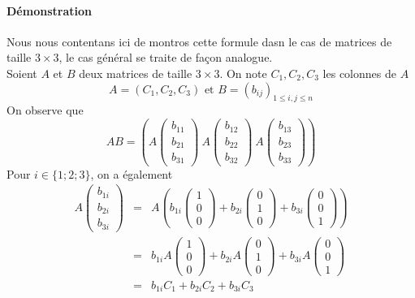 \paragraph{Démonstration} Nous nous contentans ici de montros cette formule dasn le cas de matrices de taille $3 \times 3$, le cas général se traite de façon analogue. \\
Soient $A$ et $B$ deux matrices de taille $3 \times 3$. On note $C_1, C_2, C_3$ les colonnes de $A$
$$A = (C_1, C_2, C_3) \text{ et } B=(b_{ij})_{1 \leq i, j \leq n}$$
On observe que
$$A B = \left(
  A \begin{pmatrix} b_{11} \\ b_{21} \\ b_{31} \end{pmatrix} ~ 
  A \begin{pmatrix} b_{12} \\ b_{22} \\ b_{32} \end{pmatrix} ~ 
  A \begin{pmatrix} b_{13} \\ b_{23} \\ b_{33} \end{pmatrix}
\right)$$
Pour $i \in \{1; 2; 3\}$, on a également
\begin{eqnarray*}
  A \begin{pmatrix} b_{1i} \\ b_{2i} \\ b_{3i} \end{pmatrix}
  &=& A \left( b_{1i} \begin{pmatrix} 1 \\ 0 \\ 0 \end{pmatrix} + b_{2i} \begin{pmatrix} 0 \\ 1 \\ 0 \end{pmatrix} + b_{3i} \begin{pmatrix} 0 \\ 0 \\ 1 \end{pmatrix} \right) \\
    &=& b_{1i} A \begin{pmatrix} 1 \\ 0 \\ 0 \end{pmatrix} + b_{2i} A \begin{pmatrix} 0 \\ 1 \\ 0 \end{pmatrix} + b_{3i} A \begin{pmatrix} 0 \\ 0 \\ 1 \end{pmatrix} \\
    &=& b_{1i} C_1 + b_{2i} C_2 + b_{3i} C_3
\end{eqnarray*}
